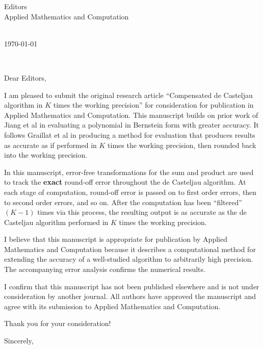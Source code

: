 \documentclass[11pt,a4paper]{letter}
\def\opening#1{\thispagestyle{empty}
{\centering\fromaddress \vspace{0.6in} \\ %
\hspace*{\longindentation}\today\hspace*{\fill}\par} %
{\raggedright \toname \\ \toaddress \par} %
\vspace{0.4in} %
\noindent #1 %
}
\begin{document}
\begin{letter}
{Editors \\
Applied Mathematics and Computation}

\opening{Dear Editors,}

I am pleased to submit the original research article
``Compensated de Casteljau algorithm in \(K\) times the working precision''
for consideration for publication in Applied Mathematics and Computation.
This manuscript builds on prior work of Jiang et al in evaluating a polynomial
in Bernstein form with greater accuracy. It follows Graillat et al in
producing a method for evaluation that produces results as accurate as if
performed in \(K\) times the working precision, then rounded back into the
working precision.

In this manuscript, error-free transformations for the sum and product
are used to track the \textbf{exact} round-off error throughout the
de Casteljau algorithm. At each stage of computation, round-off error is
passed on to first order errors, then to second order errors, and so on.
After the computation has been ``filtered'' \((K - 1)\) times via this
process, the resulting output is as accurate as the de Casteljau algorithm
performed in \(K\) times the working precision.

I believe that this manuscript is appropriate for publication by
Applied Mathematics and Computation because it describes a computational
method for extending the accuracy of a well-studied algorithm to
arbitrarily high precision. The accompanying error analysis confirms
the numerical results.

I confirm that this manuscript has not been published elsewhere and is not
under consideration by another journal. All authors have approved the
manuscript and agree with its submission to Applied Mathematics and
Computation.

Thank you for your consideration!

\closing{Sincerely,}

\end{letter}
\end{document}
